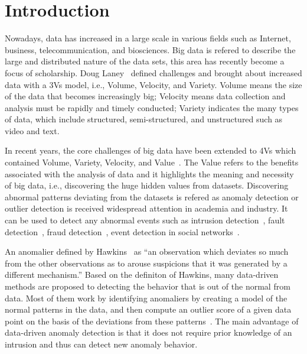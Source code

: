 \section{Introduction}\label{sec-intro}

Nowadays,
data has increased in a large scale
in various fields such as Internet,
business,
telecommunication,
and biosciences.
Big data is refered to describe
the large and distributed
nature of the data sets,
this area has recently become a focus of scholarship.
Doug Laney~\cite{laney01controlling3v} defined challenges
and  brought about  increased data
with a 3Vs model,
i.e., Volume,
Velocity,
and Variety.
Volume means the size of the data that becomes increasingly big;
Velocity means data collection and analysis 
must be rapidly and timely conducted;
Variety indicates the many types of data,
which include structured,
semi-structured,
and unstructured such as video and text.

In recent years,
the core challenges of big data
have been extended to 4Vs which
contained Volume,
Variety,
Velocity,
and Value~\cite{gantz2011extracting}.
The Value refers to the benefits associated with
the analysis of data and it highlights
the meaning and necessity of big data,
i.e.,
discovering the huge hidden values from datasets.
Discovering abnormal patterns
deviating from the
datasets is refered as anomaly detection or outlier detection
is received widespread attention in academia and industry.
It can be used to detect any abnormal events such as
intrusion detection~\cite{garcia2009anomaly},
fault detection~\cite{hwang2009survey},
fraud detection~\cite{bolton2002statistical},
event detection in social networks~\cite{sakaki2010earthquake}.

An anomalier defined by Hawkins~\cite{hawkins1980identification}
as ``an observation which
deviates so much from the other observations
as to arouse suspicions that
it was generated by a different mechanism.''
Based on the definiton of Hawkins,
many data-driven methods are proposed to   
detecting the behavior that
is out of the normal from data. 
Most of them work by
identifying anomaliers by creating a model of
the normal patterns in the data,
and then compute an outlier score of
a given data point on the basis of
the deviations from these patterns~\cite{chandola2009anomaly}.
The main advantage of data-driven anomaly detection is 
that it does not require prior knowledge of
an intrusion and thus can detect new anomaly behavior.

